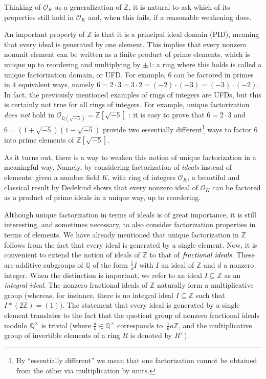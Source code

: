 \documentclass[sn-mathphys]{sn-jnl}%
\newcommand*{\OK}[1][K]{\mathcal{O}_{#1}}
\newcommand{\QQ}{\mathbb{Q}}
\renewcommand{\Z}{\mathbb{Z}}
\begin{document}
Thinking of $\OK$ as a generalization of $\Z$, it is natural to ask which of its properties
still hold in $\OK$ and, when this fails, if a reasonable weakening does.

An important property of $\Z$ is that it is a principal ideal domain (PID), meaning that every ideal is generated by one element. This implies that every nonzero nonunit element can be written as a
finite product of prime elements, which is unique up to reordering and multiplying by $\pm 1$: a ring where this holds is called a unique factorization domain, or UFD.
For example, $6$ can be factored in primes in $4$ equivalent ways, namely $6=2\cdot 3=3\cdot2=(-2)\cdot (-3)=(-3) \cdot (-2)$.
In fact, the previously mentioned examples of rings of integers are UFDs, but this is certainly not true for all rings of integers. For example, unique factorization \emph{does not} hold in $\mathcal{O}_{\QQ(\sqrt{-5})}=\Z[\sqrt{-5}]$
: it is easy to prove that $6=2\cdot3$ and $6=(1+\sqrt{-5}) (1-\sqrt{-5})$ provide two essentially different\footnote{By ``essentially different'' we mean that one factorization cannot be obtained from the other via multiplication by units.} ways to factor $6$ into prime elements of $\Z[\sqrt{-5}]$.

As it turns out, there is a way to weaken this notion of unique factorization in a meaningful way. Namely, by considering factorization of \emph{ideals} instead of elements: given a number field $K$, with ring of integers $\OK$, a beautiful and classical result by Dedekind shows that every nonzero ideal of $\OK$ can be factored as a product of prime ideals in a unique way, up to reordering.

Although unique factorization in terms of ideals is of great importance, it is still interesting, and sometimes
necessary, to also consider factorization properties in terms of elements.
We have already mentioned that unique factorization in $\Z$ follows from the fact that every ideal is generated by a single element.
Now, it is convenient to extend the notion of ideals of $\Z$ to that of $\emph{fractional ideals}$. 
These are additive subgroups of $\QQ$ of the form $\frac{1}{d} I$ with $I$ an ideal of $\Z$ and $d$ a nonzero integer.
When the distinction is important, we refer to an ideal $I \subseteq \Z$ as an \emph{integral ideal}.
The nonzero fractional ideals of $\Z$ naturally form a multiplicative group (whereas, for instance, there is no integral ideal $I\subseteq \Z$ such that $I*(2\Z)=(1)$).
The statement that every ideal is generated by a single element
translates to the fact that the quotient group of nonzero fractional ideals modulo $\QQ^\times$ is trivial (where $\frac{a}{b} \in \QQ^\times$ corresponds to~$\frac{1}{b} a \Z$, and the multiplicative group of invertible elements of a ring $R$ is denoted by $R^{\times}$).
\end{document}
